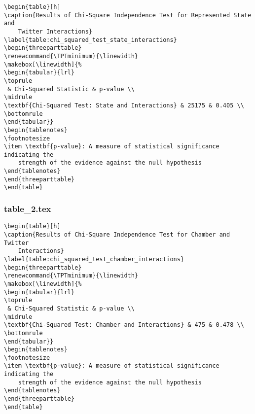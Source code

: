 \documentclass[11pt]{article}
\begin{document}
\begin{Verbatim}[tabsize=4]
\begin{table}[h]
\caption{Results of Chi-Square Independence Test for Represented State and
	Twitter Interactions}
\label{table:chi_squared_test_state_interactions}
\begin{threeparttable}
\renewcommand{\TPTminimum}{\linewidth}
\makebox[\linewidth]{%
\begin{tabular}{lrl}
\toprule
 & Chi-Squared Statistic & p-value \\
\midrule
\textbf{Chi-Squared Test: State and Interactions} & 25175 & 0.405 \\
\bottomrule
\end{tabular}}
\begin{tablenotes}
\footnotesize
\item \textbf{p-value}: A measure of statistical significance indicating the
	strength of the evidence against the null hypothesis
\end{tablenotes}
\end{threeparttable}
\end{table}

\end{Verbatim}

\subsubsection*{table\_2.tex}

\begin{Verbatim}[tabsize=4]
\begin{table}[h]
\caption{Results of Chi-Square Independence Test for Chamber and Twitter
	Interactions}
\label{table:chi_squared_test_chamber_interactions}
\begin{threeparttable}
\renewcommand{\TPTminimum}{\linewidth}
\makebox[\linewidth]{%
\begin{tabular}{lrl}
\toprule
 & Chi-Squared Statistic & p-value \\
\midrule
\textbf{Chi-Squared Test: Chamber and Interactions} & 475 & 0.478 \\
\bottomrule
\end{tabular}}
\begin{tablenotes}
\footnotesize
\item \textbf{p-value}: A measure of statistical significance indicating the
	strength of the evidence against the null hypothesis
\end{tablenotes}
\end{threeparttable}
\end{table}

\end{Verbatim}
\end{document}
